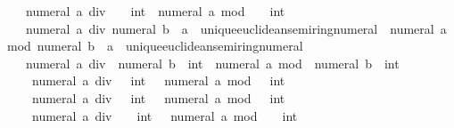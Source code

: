 \begin{isabellebody}
\ \ \ {\isachardoublequoteopen}numeral\ a\ div\ {\isacharminus}{\kern0pt}\ {}\ {\isacharcolon}{\kern0pt}{\isacharcolon}{\kern0pt}\ int{\isachardoublequoteclose}\ {\isacharbar}{\kern0pt}\ {\isachardoublequoteopen}numeral\ a\ mod\ {\isacharminus}{\kern0pt}\ {}\ {\isacharcolon}{\kern0pt}{\isacharcolon}{\kern0pt}\ int{\isachardoublequoteclose}\ {\isacharbar}{\kern0pt}\isanewline
\ \ \ {\isachardoublequoteopen}numeral\ a\ div\ numeral\ b\ {\isacharcolon}{\kern0pt}{\isacharcolon}{\kern0pt}\ {\isacharprime}{\kern0pt}a\ {\isacharcolon}{\kern0pt}{\isacharcolon}{\kern0pt}\ unique{\isacharunderscore}{\kern0pt}euclidean{\isacharunderscore}{\kern0pt}semiring{\isacharunderscore}{\kern0pt}numeral{\isachardoublequoteclose}\ {\isacharbar}{\kern0pt}\ {\isachardoublequoteopen}numeral\ a\ mod\ numeral\ b\ {\isacharcolon}{\kern0pt}{\isacharcolon}{\kern0pt}\ {\isacharprime}{\kern0pt}a\ {\isacharcolon}{\kern0pt}{\isacharcolon}{\kern0pt}\ unique{\isacharunderscore}{\kern0pt}euclidean{\isacharunderscore}{\kern0pt}semiring{\isacharunderscore}{\kern0pt}numeral{\isachardoublequoteclose}\ {\isacharbar}{\kern0pt}\isanewline
\ \ \ {\isachardoublequoteopen}numeral\ a\ div\ {\isacharminus}{\kern0pt}\ numeral\ b\ {\isacharcolon}{\kern0pt}{\isacharcolon}{\kern0pt}\ int{\isachardoublequoteclose}\ {\isacharbar}{\kern0pt}\ {\isachardoublequoteopen}numeral\ a\ mod\ {\isacharminus}{\kern0pt}\ numeral\ b\ {\isacharcolon}{\kern0pt}{\isacharcolon}{\kern0pt}\ int{\isachardoublequoteclose}\ {\isacharbar}{\kern0pt}\isanewline
\ \ \ {\isachardoublequoteopen}{\isacharminus}{\kern0pt}\ numeral\ a\ div\ {}\ {\isacharcolon}{\kern0pt}{\isacharcolon}{\kern0pt}\ int{\isachardoublequoteclose}\ {\isacharbar}{\kern0pt}\ {\isachardoublequoteopen}{\isacharminus}{\kern0pt}\ numeral\ a\ mod\ {}\ {\isacharcolon}{\kern0pt}{\isacharcolon}{\kern0pt}\ int{\isachardoublequoteclose}\ {\isacharbar}{\kern0pt}\isanewline
\ \ \ {\isachardoublequoteopen}{\isacharminus}{\kern0pt}\ numeral\ a\ div\ {}\ {\isacharcolon}{\kern0pt}{\isacharcolon}{\kern0pt}\ int{\isachardoublequoteclose}\ {\isacharbar}{\kern0pt}\ {\isachardoublequoteopen}{\isacharminus}{\kern0pt}\ numeral\ a\ mod\ {}\ {\isacharcolon}{\kern0pt}{\isacharcolon}{\kern0pt}\ int{\isachardoublequoteclose}\ {\isacharbar}{\kern0pt}\isanewline
\ \ \ {\isachardoublequoteopen}{\isacharminus}{\kern0pt}\ numeral\ a\ div\ {\isacharminus}{\kern0pt}\ {}\ {\isacharcolon}{\kern0pt}{\isacharcolon}{\kern0pt}\ int{\isachardoublequoteclose}\ {\isacharbar}{\kern0pt}\ {\isachardoublequoteopen}{\isacharminus}{\kern0pt}\ numeral\ a\ mod\ {\isacharminus}{\kern0pt}\ {}\ {\isacharcolon}{\kern0pt}{\isacharcolon}{\kern0pt}\ int{\isachardoublequoteclose}\ {\isacharbar}{\kern0pt}\isanewline

\end{isabellebody}
